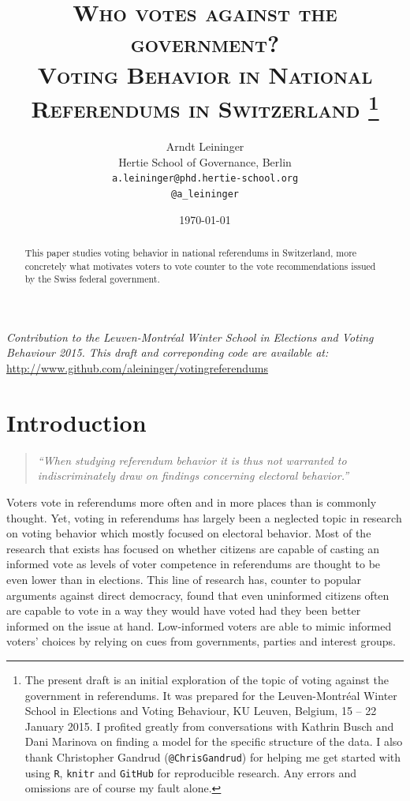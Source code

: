 \documentclass[11pt,a4paper]{article}\usepackage[]{graphicx}\usepackage[]{color}
\author{Arndt Leininger \\ Hertie School of Governance, Berlin \\ \texttt{a.leininger@phd.hertie-school.org} \\ \large \texttt{@a\_leininger}}
\title{{\textsc{Who votes against the government?}}\\ \large{\textsc{Voting Behavior in National Referendums in Switzerland}}
\footnote{The present draft is an initial exploration of the topic of voting against the government in referendums. It was prepared for the Leuven-Montréal Winter School in Elections and Voting Behaviour, KU Leuven, Belgium, 15 -- 22 January 2015. I profited greatly from conversations with Kathrin Busch and Dani Marinova on finding a model for the specific structure of the data. I also thank Christopher Gandrud (\texttt{@ChrisGandrud}) for helping me get started with using \texttt{R}, \texttt{knitr} and \texttt{GitHub} for reproducible research. Any errors and omissions are of course my fault alone.}}
\date{\today}
\begin{document}
\maketitle

{\noindent \small \textit{Contribution to the Leuven-Montréal Winter School in Elections and Voting Behaviour 2015. This draft and correponding code are available at:}\\ \url{http://www.github.com/aleininger/votingreferendums}}



\begin{abstract}
  
\noindent This paper studies voting behavior in national referendums in Switzerland, more concretely what motivates voters to vote counter to the vote recommendations issued by the Swiss federal government.
\end{abstract}	

\vfill

\newpage

\section{Introduction}\label{sec:introduction}

	\begin{quote}
		\textit{``When studying referendum behavior it is thus not warranted to
		indiscriminately draw on findings concerning electoral behavior.''} \citep[514]{schoen_wahlen_2012}
	\end{quote}

    Voters vote in referendums more often and in more places than is commonly thought. Yet, voting in referendums has largely been a neglected topic in research on voting behavior which mostly focused on electoral behavior. Most of the research that exists has focused on whether citizens are capable of casting an informed vote as levels of voter competence in referendums are thought to be even lower than in elections. This line of research has, counter to popular arguments against direct democracy, found that even uninformed citizens often are capable to vote in a way they would have voted had they been better informed on the issue at hand. Low-informed  voters are able to mimic informed voters' choices by relying on cues from governments, parties and interest groups.
    
\end{document}
